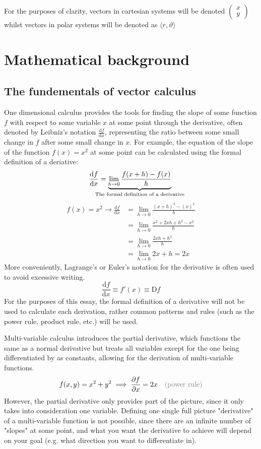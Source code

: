 \documentclass[a4paper,12pt]{article}
\renewcommand{\theta}{\vartheta}      		%
\newcommand{\der}[2]{\frac{\mathrm{d} #1}{\mathrm{d} #2}}           %
\newcommand{\partialder}[2]{\frac{\partial #1}{\partial #2}}        %
\newcommand{\justify}[1]{\text{\color{gray}(#1)}} 			%
\begin{document}
For the purposes of clarity, vectors in cartesian systems will be denoted $\begin{pmatrix}x\\y\end{pmatrix}$ whilst vectors in polar systems will be denoted as $\langle r,\theta\rangle$

\section{Mathematical background}
\subsection{The fundementals of vector calculus}
One dimensional calculus provides the tools for finding the slope of some function $f$ with respect to some variable $x$ at some point through the derivative, often denoted by Leibniz's notation $\der{f}{x}$, representing the ratio between some small change in $f$ after some small change in $x$. For example, the equation of the slope of the function $f(x)=x^2$ at some point can be calculated using the formal definition of a deriative:
\begin{equation}
	\der{f}{x}=\underbrace{\lim_{h\rightarrow0}\frac{f(x+h)-f(x)}{h}}_\text{\hidewidth The formal definition of a derivative\hidewidth}\\
\end{equation}
\begin{align*}
	f(x)=x^2\rightarrow\der{f}{x}&=\lim_{h\rightarrow0}\frac{(x+h)^2-(x)^2}{h}\\
	&=\lim_{h\rightarrow0}\frac{x^2+2xh+h^2-x^2}{h}\\
	&=\lim_{h\rightarrow0}\frac{2xh+h^2}{h}\\
	&=\lim_{h\rightarrow0}2x+h=2x
\end{align*}
More conveniently, Lagrange's or Euler's notation for the derivative is often used to avoid excessive writing.
$$\der{f}{x}\equiv f'(x)\equiv \mathrm{D}f$$
For the purposes of this essay, the formal definition of a derivative will not be used to calculate each derivation, rather common patterns and rules (such as the power rule, product rule, etc.) will be used. 

Multi-variable calculus introduces the partial derivative, which functions the same as a normal derivative but treats all variables except for the one being differentiated by as constants, allowing for the derivation of multi-variable functions.
\begin{align*}
	f(x,y)=x^2+y^2\implies\partialder{f}{x}=2x && \justify{power rule}
\end{align*}
However, the partial derivative only provides part of the picture, since it only takes into consideration one variable. Defining one single full picture "derivative" of a multi-variable function is not possible, since there are an infinite number of "slopes" at some point, and what you want the derivative to achieve will depend on your goal (e.g. what direction you want to differentiate in).
\end{document}
